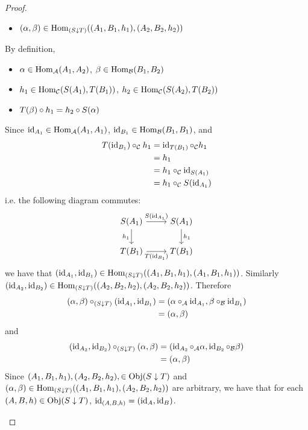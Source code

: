 \documentclass{book}
\begin{document}
\begin{proof}
\begin{itemize}
\begin{itemize}
				\item $(\alpha, \beta) \in \operatorname{Hom}_{(S \downarrow T)}((A_1, B_1, h_1), (A_2, B_2, h_2))$ 
			\end{itemize}
			By definition, 
			\begin{itemize}
				\item $\alpha \in \operatorname{Hom}_{\mathcal{A}}(A_1, A_2)$, $\beta \in \operatorname{Hom}_{\mathcal{B}}(B_1, B_2)$
				\item $h_1 \in \operatorname{Hom}_{\mathcal{C}}(S(A_1), T(B_1))$, $h_2 \in \operatorname{Hom}_{\mathcal{C}}(S(A_2), T(B_2))$ 
				\item $T(\beta) \circ h_1 = h_2 \circ S(\alpha)$
			\end{itemize}
			Since $\operatorname{id}_{A_1} \in \operatorname{Hom}_{\mathcal{A}}(A_1, A_1)$, $\operatorname{id}_{B_1} \in \operatorname{Hom}_{\mathcal{B}}(B_1, B_1)$, and
			\begin{align*}
				T(\operatorname{id}_{B_1}) \circ_{\mathcal{C}}  h_1 
				& = \operatorname{id}_{T(B_1)} \circ_{\mathcal{C}} h_1 \\
				& = h_1 \\
				& = h_1 \circ_{\mathcal{C}} \operatorname{id}_{S(A_1)} \\
				& = h_1 \circ_{\mathcal{C}} S(\operatorname{id}_{A_1}) 
			\end{align*}
			i.e. the following diagram commutes:
			\[
			\begin{tikzcd}
				S(A_1) \arrow[r, "S(\id_{A_1})"] \arrow[d, "h_1"']  & S(A_1)  \arrow[d, "h_1"] \\
				T(B_1) \arrow[r, "T(\id_{B_1})"']                   & T(B_1)
			\end{tikzcd}
			\]
			we have that $(\operatorname{id}_{A_1}, \operatorname{id}_{B_1}) \in \operatorname{Hom}_{(S \downarrow T)}((A_1, B_1, h_1), (A_1, B_1, h_1))$. Similarly $(\operatorname{id}_{A_2}, \operatorname{id}_{B_2}) \in \operatorname{Hom}_{(S \downarrow T)}((A_2, B_2, h_2), (A_2, B_2, h_2))$. Therefore
			\begin{align*}
				(\alpha, \beta) \circ_{(S \downarrow T)} (\operatorname{id}_{A_1}, \operatorname{id}_{B_1}) 
				& = (\alpha \circ_{\mathcal{A}} \operatorname{id}_{A_1}, \beta \circ_{\mathcal{B}} \operatorname{id}_{B_1}) \\
				& = (\alpha, \beta)
			\end{align*}
			and 
			\begin{align*}
				(\operatorname{id}_{A_2}, \operatorname{id}_{B_2}) \circ_{(S\downarrow T)} (\alpha, \beta) 
				& = (\operatorname{id}_{A_2} \circ_{\mathcal{A}} \alpha ,  \operatorname{id}_{B_2} \circ_{\mathcal{B}} \beta ) \\
				& = (\alpha, \beta)
			\end{align*}
			Since $(A_1, B_1, h_1), (A_2, B_2, h_2), \in \operatorname{Obj}(S \downarrow T)$ and\\ $(\alpha, \beta) \in \operatorname{Hom}_{(S \downarrow T)}((A_1, B_1, h_1), (A_2, B_2, h_2))$ are arbitrary, we have that for each $(A, B, h) \in \operatorname{Obj}(S \downarrow T)$, $\operatorname{id}_{(A, B, h)} = (\operatorname{id}_A, \operatorname{id}_B)$.
		\end{itemize}
	\end{proof}
\end{document}
